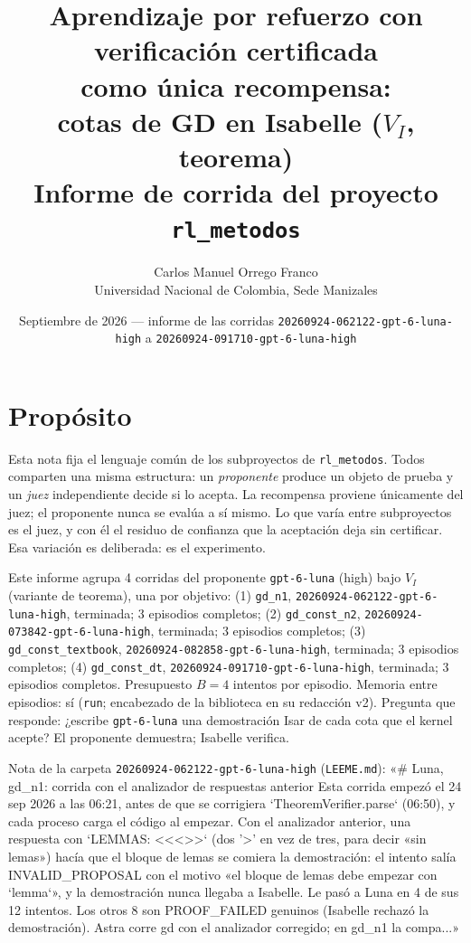 \documentclass[11pt,a4paper]{article}
\title{Aprendizaje por refuerzo con verificación certificada\\como única recompensa:\\cotas de GD en Isabelle ($V_I$, teorema)\\[0.4em]\large Informe de corrida del proyecto \texttt{rl\_metodos}}
\author{Carlos Manuel Orrego Franco\\Universidad Nacional de Colombia, Sede Manizales}
\date{Septiembre de 2026 --- informe de las corridas \texttt{20260924-\allowbreak{}062122-\allowbreak{}gpt-\allowbreak{}6-\allowbreak{}luna-\allowbreak{}high} a \texttt{20260924-\allowbreak{}091710-\allowbreak{}gpt-\allowbreak{}6-\allowbreak{}luna-\allowbreak{}high}}
\begin{document}
\maketitle

\section{Propósito}

Esta nota fija el lenguaje común de los subproyectos de \texttt{rl\_metodos}. Todos comparten una misma estructura: un \emph{proponente} produce un objeto de prueba y un \emph{juez} independiente decide si lo acepta. La recompensa proviene únicamente del juez; el proponente nunca se evalúa a sí mismo. Lo que varía entre subproyectos es el juez, y con él el residuo de confianza que la aceptación deja sin certificar. Esa variación es deliberada: es el experimento.

{\sloppy Este informe agrupa 4 corridas del proponente \texttt{gpt-\allowbreak{}6-\allowbreak{}luna} (high) bajo $V_I$ (variante de teorema), una por objetivo: (1) \texttt{gd\_\allowbreak{}n1}, \texttt{20260924-\allowbreak{}062122-\allowbreak{}gpt-\allowbreak{}6-\allowbreak{}luna-\allowbreak{}high}, terminada; 3 episodios completos; (2) \texttt{gd\_\allowbreak{}const\_\allowbreak{}n2}, \texttt{20260924-\allowbreak{}073842-\allowbreak{}gpt-\allowbreak{}6-\allowbreak{}luna-\allowbreak{}high}, terminada; 3 episodios completos; (3) \texttt{gd\_\allowbreak{}const\_\allowbreak{}textbook}, \texttt{20260924-\allowbreak{}082858-\allowbreak{}gpt-\allowbreak{}6-\allowbreak{}luna-\allowbreak{}high}, terminada; 3 episodios completos; (4) \texttt{gd\_\allowbreak{}const\_\allowbreak{}dt}, \texttt{20260924-\allowbreak{}091710-\allowbreak{}gpt-\allowbreak{}6-\allowbreak{}luna-\allowbreak{}high}, terminada; 3 episodios completos. Presupuesto $B = 4$ intentos por episodio. Memoria entre episodios: sí (\texttt{run}; encabezado de la biblioteca en su redacción v2). Pregunta que responde: ¿escribe \texttt{gpt-\allowbreak{}6-\allowbreak{}luna} una demostración Isar de cada cota que el kernel acepte? El proponente demuestra; Isabelle verifica.\par}

{\sloppy Nota de la carpeta \texttt{20260924-\allowbreak{}062122-\allowbreak{}gpt-\allowbreak{}6-\allowbreak{}luna-\allowbreak{}high} (\texttt{LEEME.md}): «\# Luna, gd\_n1: corrida con el analizador de respuestas anterior Esta corrida empezó el 24 sep 2026 a las 06:21, antes de que se corrigiera `TheoremVerifier.parse` (06:50), y cada proceso carga el código al empezar. Con el analizador anterior, una respuesta con `LEMMAS: <{}<{}<{}>{}>{}` (dos '{}>{}' en vez de tres, para decir «sin lemas») hacía que el bloque de lemas se comiera la demostración: el intento salía INVALID\_PROPOSAL con el motivo «el bloque de lemas debe empezar con `lemma`», y la demostración nunca llegaba a Isabelle. Le pasó a Luna en 4 de sus 12 intentos. Los otros 8 son PROOF\_FAILED genuinos (Isabelle rechazó la demostración). Astra corre gd con el analizador corregido; en gd\_n1 la compa...»\par}
\end{document}
